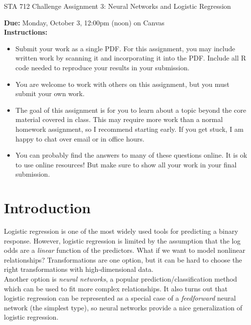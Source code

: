 \documentclass[11pt]{article}
\begin{document}
\begin{center}
\Large
STA 712 Challenge Assignment 3: Neural Networks and Logistic Regression\\
\normalsize
\vspace{5mm}
\end{center}

\noindent \textbf{Due:} Monday, October 3, 12:00pm (noon) on Canvas\\ 

\noindent \textbf{Instructions:} 
\begin{itemize}
\item Submit your work as a single PDF. For this assignment, you may include written work by scanning it and incorporating it into the PDF. Include all R code needed to reproduce your results in your submission.
\item You are welcome to work with others on this assignment, but you must submit your own work.
\item The goal of this assignment is for you to learn about a topic beyond the core material covered in class. This may require more work than a normal homework assignment, so I recommend starting early. If you get stuck, I am happy to chat over email or in office hours.
\item You can probably find the answers to many of these questions online. It is ok to use online resources! But make sure to show all your work in your final submission.
\end{itemize}

\section*{Introduction}

Logistic regression is one of the most widely used tools for predicting a binary response. However, logistic regression is limited by the assumption that the log odds are a \textit{linear} function of the predictors. What if we want to model nonlinear relationships? Transformations are one option, but it can be hard to choose the right transformations with high-dimensional data.\\

Another option is \textit{neural networks}, a popular prediction/classification method which can be used to fit more complex relationships. It also turns out that logistic regression can be represented as a special case of a \textit{feedforward} neural network (the simplest type), so neural networks provide a nice generalization of logistic regression.\\
\end{document}
